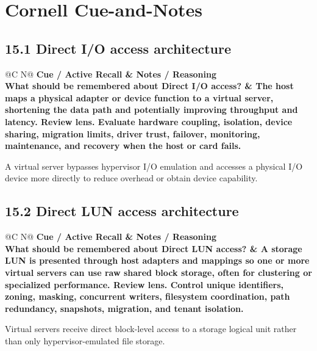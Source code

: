 \documentclass[11pt]{article}
\newcommand{\CornellHeader}{\rowcolor{Navy}\color{white}\bfseries Cue / Active Recall & \color{white}\bfseries Notes / Reasoning \\\endhead}
\newcommand{\CornellRow}[2]{\cellcolor{CueGray}\textbf{#1} & #2 \\\addlinespace[3pt]}
\begin{document}
\section{Cornell Cue-and-Notes}
\subsection{15.1 Direct I/O access architecture}
\begin{longtable}{@{}C N@{}}
\CornellHeader
\CornellRow{What should be remembered about Direct I/O access?}{The host maps a physical adapter or device function to a virtual server, shortening the data path and potentially improving throughput and latency. \textbf{Review lens.} Evaluate hardware coupling, isolation, device sharing, migration limits, driver trust, failover, monitoring, maintenance, and recovery when the host or card fails.}
\end{longtable}
\begin{sectionsummarybox}
A virtual server bypasses hypervisor I/O emulation and accesses a physical I/O device more directly to reduce overhead or obtain device capability.
\end{sectionsummarybox}
\subsection{15.2 Direct LUN access architecture}
\begin{longtable}{@{}C N@{}}
\CornellHeader
\CornellRow{What should be remembered about Direct LUN access?}{A storage LUN is presented through host adapters and mappings so one or more virtual servers can use raw shared block storage, often for clustering or specialized performance. \textbf{Review lens.} Control unique identifiers, zoning, masking, concurrent writers, filesystem coordination, path redundancy, snapshots, migration, and tenant isolation.}
\end{longtable}
\begin{sectionsummarybox}
Virtual servers receive direct block-level access to a storage logical unit rather than only hypervisor-emulated file storage.
\end{sectionsummarybox}
\end{document}

